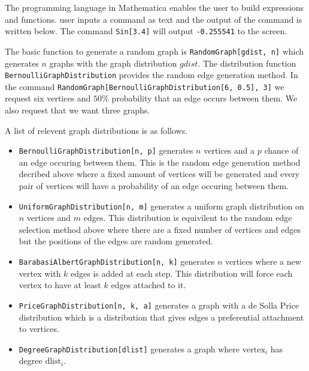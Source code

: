 \documentclass{article}
\newcommand{\code}[1]{\texttt{#1}}
\begin{document}
    The programming language in Mathematica enables the user to build expressions and functions. user inputs a command as text and the output of the command is written below. The command \code{Sin[3.4]} will output \code{-0.255541} to the screen.

    The basic function to generate a random graph is \code{RandomGraph[gdist, n]} which generates $n$ graphs with the graph distribution $gdist$. The distribution function \code{BernoulliGraphDistribution} provides the random edge generation method. In the command \code{RandomGraph[BernoulliGraphDistribution[6, 0.5], 3]} we request six vertices and $50\%$ probability that an edge occurs between them. We also request that we want three graphs.

    


    A list of relevent graph distributions is as follows.

    \begin{itemize}
    \item
    \code{BernoulliGraphDistribution[n, p]} generates $n$ vertices and a $p$ chance of an edge occuring between them. This is the random edge generation method decribed above where a fixed amount of vertices will be generated and every pair of vertices will have a probability of an edge occuring between them.

    \item 
    \code{UniformGraphDistribution[n, m]} generates a uniform graph distribution on $n$ vertices and $m$ edges. This distribution is equivilent to the random edge selection method above where there are a fixed number of vertices and edges but the positions of the edges are random generated.

    \item 
    \code{BarabasiAlbertGraphDistribution[n, k]} generates $n$ vertices where a new vertex with $k$ edges is added at each step. This distribution will force each vertex to have at least $k$ edges attached to it.

    \item
    \code{PriceGraphDistribution[n, k, a]} generates a graph with a de Solla Price distribution which is a distribution that gives edges a preferential attachment to vertices.

    \item
    \code{DegreeGraphDistribution[dlist]} generates a graph where $\mathrm{vertex}_i$ has degree $\mathrm{dlist}_i$.
    \end{itemize}
\end{document}
